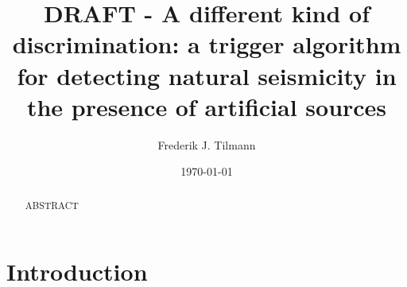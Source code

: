 \documentclass[11pt]{article}
\title{DRAFT -    A different kind of discrimination: a trigger algorithm for detecting natural seismicity in the presence of artificial sources}
\author{Frederik J. Tilmann}
\date{\today}
\providecommand{\DIFadd}[1]{{\protect\color{blue}\uwave{#1}}} %
\providecommand{\DIFaddbegin}{} %
\providecommand{\DIFaddend}{} %
\providecommand{\DIFdelbegin}{} %
\providecommand{\DIFdelend}{} %
\begin{document}
\maketitle

\begin{abstract}
ABSTRACT \DIFaddbegin \DIFadd{\% %
}\\%
\DIFaddend \end{abstract}

\DIFdelbegin %
\DIFdelend \DIFaddbegin \section{\DIFaddend Introduction}
\end{document}

